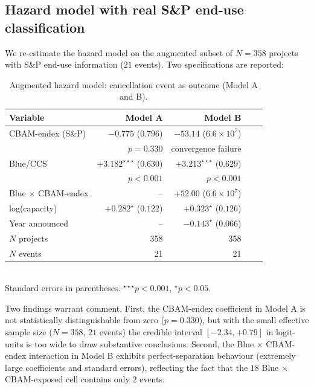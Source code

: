 \documentclass[11pt,a4paper]{article}
\begin{document}
\subsection{Hazard model with real S\&P end-use classification}

We re-estimate the hazard model on the augmented subset of $N = 358$ projects with S\&P end-use information ($21$ events). Two specifications are reported:

\begin{table}[ht]
\centering
\caption{Augmented hazard model: cancellation event as outcome (Model A and B).}
\label{tab:app-augmented-hazard}
\begin{tabular}{lrrrr}
\toprule
Variable & Model A & Model B & \\
\midrule
CBAM-endex (S\&P)        & $-0.775$ ($0.796$) & $-53.14$ ($6.6 \times 10^{7}$) \\
                          & $p = 0.330$         & convergence failure \\
Blue/CCS                  & $+3.182^{\star\star\star}$ ($0.630$) & $+3.213^{\star\star\star}$ ($0.629$) \\
                          & $p < 0.001$         & $p < 0.001$ \\
Blue $\times$ CBAM-endex  & --                  & $+52.00$ ($6.6 \times 10^{7}$) \\
log(capacity)             & $+0.282^{\star}$ ($0.122$) & $+0.323^{\star}$ ($0.126$) \\
Year announced            & --                  & $-0.143^{\star}$ ($0.066$) \\
\midrule
$N$ projects              & 358 & 358 \\
$N$ events                & 21 & 21 \\
\bottomrule
\end{tabular}
\\\footnotesize{Standard errors in parentheses. $^{\star\star\star}p<0.001$, $^{\star}p<0.05$.}
\end{table}

Two findings warrant comment. First, the CBAM-endex coefficient in Model A is not statistically distinguishable from zero ($p = 0.330$), but with the small effective sample size ($N=358$, $21$ events) the credible interval $[-2.34, +0.79]$ in logit-units is too wide to draw substantive conclusions. Second, the Blue $\times$ CBAM-endex interaction in Model B exhibits perfect-separation behaviour (extremely large coefficients and standard errors), reflecting the fact that the $18$ Blue $\times$ CBAM-exposed cell contains only $2$ events.
\end{document}
